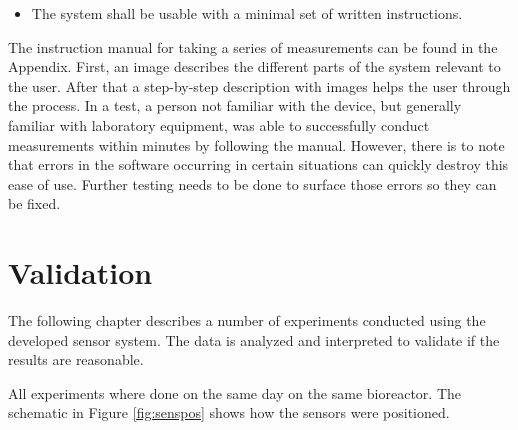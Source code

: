 \begin{itemize}
\item  The system shall be usable with a minimal set of written instructions.\\
\end{itemize}

The instruction manual for taking a series of measurements can be found in the Appendix. First, an image describes the different parts of the system relevant to the user. After that a step-by-step description with images helps the user through the process. In a test, a person not familiar with the device, but generally familiar with laboratory equipment, was able to successfully conduct measurements within minutes by following the manual. However, there is to note that errors in the software occurring in certain situations can quickly destroy this ease of use. Further testing needs to be done to surface those errors so they can be fixed.

\section{Validation} \label{val}

The following chapter describes a number of experiments conducted using the developed sensor system. The data is analyzed and interpreted to validate if the results are reasonable. 

All experiments where done on the same day on the same bioreactor. The schematic in Figure \ref{fig:senspos} shows how the sensors were positioned.

